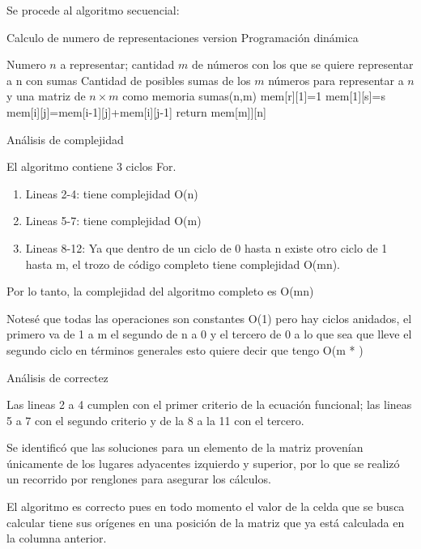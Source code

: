 \documentclass[9pt,spanish]{article}
\numberwithin{equation}{section}
\begin{document}
Se procede al algoritmo secuencial:

\begin{algorithm}[H]
	\caption{Calculo de numero de representaciones version Programaci\'on din\'amica}
	\begin{algorithmic}[1]
	\Require Numero $n$ a representar; cantidad $m$ de n\'umeros con los que se quiere representar a n con sumas
	\Ensure Cantidad de posibles sumas de los $m$ n\'umeros para representar a $n$ y una matriz de $n \times m$ como memoria
	\State sumas(n,m)
	\State mem[r][1]=1
	\EndFor
	\State mem[1][s]=s
	\EndFor
	\State mem[i][j]=mem[i-1][j]+mem[i][j-1]
	\EndFor	
	\EndFor
	\State return mem[m]][n]
	\end{algorithmic}
\end{algorithm}


Análisis de complejidad

El algoritmo contiene 3 ciclos For.
\begin{enumerate}
\item Lineas 2-4: tiene complejidad O(n)
\item Lineas 5-7: tiene complejidad O(m)
\item Lineas 8-12: Ya que dentro de un ciclo de 0 hasta n existe otro ciclo de 1 hasta m, el trozo de código completo tiene complejidad O(mn). 
\end{enumerate}

Por lo tanto, la complejidad del algoritmo completo es O(mn)

Notesé que todas las operaciones son constantes O(1) pero hay ciclos anidados, el primero va de 1 a m el segundo de n a 0 y el tercero de 0 a lo que sea que lleve el segundo ciclo en términos generales esto quiere decir que tengo O(m * )

Análisis de correctez

Las lineas 2 a 4 cumplen con el primer criterio de la ecuaci\'on funcional; las lineas 5 a 7 con el segundo criterio y de la 8  a la 11 con el tercero.

Se identific\'o que las soluciones para un elemento de la matriz proven\'ian \'unicamente de los lugares adyacentes izquierdo y superior, por lo que se realiz\'o un recorrido por renglones para asegurar los c\'alculos.

El algoritmo es correcto pues en todo momento el valor de la celda que se busca calcular tiene sus orígenes en una posición de la matriz que ya está calculada en la columna anterior.
\end{document}
